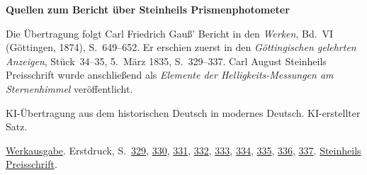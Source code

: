 \clearpage\thispagestyle{empty}
\begin{center}\Large\bfseries Quellen zum Bericht über Steinheils Prismenphotometer\end{center}

Die Übertragung folgt Carl Friedrich Gauß’ Bericht in den \emph{Werken}, Bd.~VI (Göttingen, 1874), S.~649--652. Er erschien zuerst in den \emph{Göttingischen gelehrten Anzeigen}, Stück~34--35, 5.~März 1835, S.~329--337. Carl August Steinheils Preisschrift wurde anschließend als \emph{Elemente der Helligkeits-Messungen am Sternenhimmel} veröffentlicht.

KI-Übertragung aus dem historischen Deutsch in modernes Deutsch. KI-erstellter Satz.

\href{https://gdz.sub.uni-goettingen.de/id/PPN236007467}{Werkausgabe}. Erstdruck, S.~\href{https://images.p.sub.uni-goettingen.de/iiif/image/gdz:PPN385030444_1835_1:00000331/full/1650,/0/default.jpg}{329}, \href{https://images.p.sub.uni-goettingen.de/iiif/image/gdz:PPN385030444_1835_1:00000332/full/1650,/0/default.jpg}{330}, \href{https://images.p.sub.uni-goettingen.de/iiif/image/gdz:PPN385030444_1835_1:00000333/full/1650,/0/default.jpg}{331}, \href{https://images.p.sub.uni-goettingen.de/iiif/image/gdz:PPN385030444_1835_1:00000334/full/1650,/0/default.jpg}{332}, \href{https://images.p.sub.uni-goettingen.de/iiif/image/gdz:PPN385030444_1835_1:00000335/full/1650,/0/default.jpg}{333}, \href{https://images.p.sub.uni-goettingen.de/iiif/image/gdz:PPN385030444_1835_1:00000336/full/1650,/0/default.jpg}{334}, \href{https://images.p.sub.uni-goettingen.de/iiif/image/gdz:PPN385030444_1835_1:00000337/full/1650,/0/default.jpg}{335}, \href{https://images.p.sub.uni-goettingen.de/iiif/image/gdz:PPN385030444_1835_1:00000338/full/1650,/0/default.jpg}{336}, \href{https://images.p.sub.uni-goettingen.de/iiif/image/gdz:PPN385030444_1835_1:00000339/full/1650,/0/default.jpg}{337}. \href{https://doi.org/10.3931/e-rara-95717}{Steinheils Preisschrift}.

\clearpage
